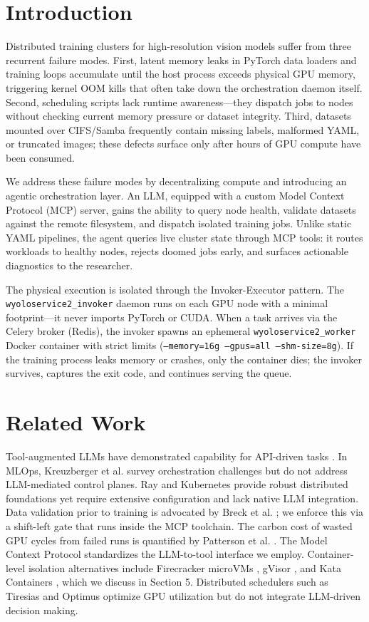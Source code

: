 \documentclass[10pt,twocolumn,letterpaper]{article}
\begin{document}
\section{Introduction}
Distributed training clusters for high-resolution vision models suffer from three recurrent failure modes. First, latent memory leaks in PyTorch data loaders and training loops accumulate until the host process exceeds physical GPU memory, triggering kernel OOM kills that often take down the orchestration daemon itself. Second, scheduling scripts lack runtime awareness---they dispatch jobs to nodes without checking current memory pressure or dataset integrity. Third, datasets mounted over CIFS/Samba frequently contain missing labels, malformed YAML, or truncated images; these defects surface only after hours of GPU compute have been consumed.

We address these failure modes by decentralizing compute and introducing an agentic orchestration layer. An LLM, equipped with a custom Model Context Protocol (MCP) server, gains the ability to query node health, validate datasets against the remote filesystem, and dispatch isolated training jobs. Unlike static YAML pipelines, the agent queries live cluster state through MCP tools: it routes workloads to healthy nodes, rejects doomed jobs early, and surfaces actionable diagnostics to the researcher.

The physical execution is isolated through the Invoker-Executor pattern. The \texttt{wyoloservice2\_invoker} daemon runs on each GPU node with a minimal footprint---it never imports PyTorch or CUDA. When a task arrives via the Celery broker (Redis), the invoker spawns an ephemeral \texttt{wyoloservice2\_worker} Docker container with strict limits (\texttt{--memory=16g --gpus=all --shm-size=8g}). If the training process leaks memory or crashes, only the container dies; the invoker survives, captures the exit code, and continues serving the queue.

\section{Related Work}
Tool-augmented LLMs have demonstrated capability for API-driven tasks \cite{schick2023toolformer}. In MLOps, Kreuzberger et al. \cite{kreuzberger2023mlops} survey orchestration challenges but do not address LLM-mediated control planes. Ray \cite{moritz2018ray} and Kubernetes \cite{burns2016borg} provide robust distributed foundations yet require extensive configuration and lack native LLM integration. Data validation prior to training is advocated by Breck et al. \cite{breck2019data}; we enforce this via a shift-left gate that runs inside the MCP toolchain. The carbon cost of wasted GPU cycles from failed runs is quantified by Patterson et al. \cite{patterson2021carbon}. The Model Context Protocol \cite{anthropic2024mcp} standardizes the LLM-to-tool interface we employ. Container-level isolation alternatives include Firecracker microVMs \cite{agache2020firecracker}, gVisor \cite{gvisorpaper}, and Kata Containers \cite{katacontainers}, which we discuss in Section 5. Distributed schedulers such as Tiresias \cite{gu2019tiresias} and Optimus \cite{peng2018optimus} optimize GPU utilization but do not integrate LLM-driven decision making.
\end{document}
